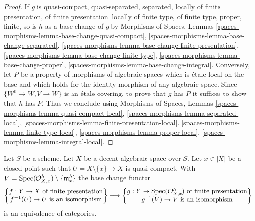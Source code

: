 \begin{proof}
If $g$ is quasi-compact, quasi-separated, separated, locally of finite
presentation, of finite presentation, locally of finite type, of finite type,
proper, finite, so is $h$ as a base change of $g$ by
Morphisms of Spaces, Lemmas
\ref{spaces-morphisms-lemma-base-change-quasi-compact},
\ref{spaces-morphisms-lemma-base-change-separated},
\ref{spaces-morphisms-lemma-base-change-finite-presentation},
\ref{spaces-morphisms-lemma-base-change-finite-type},
\ref{spaces-morphisms-lemma-base-change-proper},
\ref{spaces-morphisms-lemma-base-change-integral}.
Conversely, let $P$ be a property of morphisms of algebraic
spaces which is \'etale local on the base and which holds for
the identity morphism of any algebraic space.
Since $\{W^0 \to W, V \to W\}$ is an \'etale
covering, to prove that $g$ has $P$ it suffices to show
that $h$ has $P$. Thus we conclude using
Morphisms of Spaces, Lemmas
\ref{spaces-morphisms-lemma-quasi-compact-local},
\ref{spaces-morphisms-lemma-separated-local},
\ref{spaces-morphisms-lemma-finite-presentation-local},
\ref{spaces-morphisms-lemma-finite-type-local},
\ref{spaces-morphisms-lemma-proper-local},
\ref{spaces-morphisms-lemma-integral-local}.
\end{proof}

\begin{lemma}
\label{lemma-modifications}
Let $S$ be a scheme. Let $X$ be a decent algebraic space over $S$.
Let $x \in |X|$ be a closed point such that $U = X \setminus \{x\} \to X$
is quasi-compact. With
$V = \mathop{\mathrm{Spec}}(\mathcal{O}_{X, x}^h) \setminus \{\mathfrak m_x^h\}$
the base change functor
$$
\left\{
\begin{matrix}
f : Y \to X\text{ of finite presentation} \\
f^{-1}(U) \to U\text{ is an isomorphism}
\end{matrix}
\right\}
\longrightarrow
\left\{
\begin{matrix}
g : Y \to \mathop{\mathrm{Spec}}(\mathcal{O}_{X, x}^h)\text{ of finite presentation} \\
g^{-1}(V) \to V\text{ is an isomorphism}
\end{matrix}
\right\}
$$
is an equivalence of categories.
\end{lemma}

